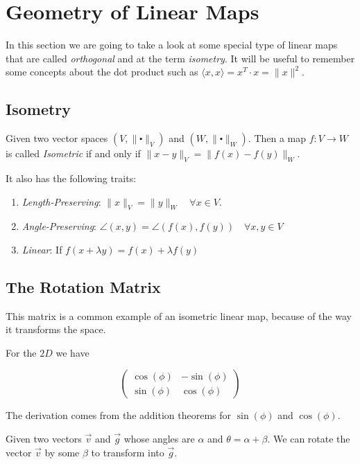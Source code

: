 \newpage
\section{Geometry of Linear Maps}

In this section we are going to take a look at some special type of linear maps that are called \emph{orthogonal} 
and at the term \emph{isometry}. It will be useful to remember some concepts about the dot product such as 
\(\langle x, x \rangle = x^T \cdot x = \|x\|^2\).

\subsection{Isometry}

Given two vector spaces \((V, \|\centerdot\|_V)\) and \((W, \|\centerdot\|_W)\). Then a map 
\(f: V \to W\) is called \emph{Isometric} if and only if \(\|x - y\|_V = \|f(x) - f(y)\|_W \).
\vspace{\baselineskip} 

It also has the following traits:
\begin{enumerate}
	\item \emph{Length-Preserving}: \(\|x\|_V = \|y\|_W \quad \forall x \in V\).
	\item \emph{Angle-Preserving}: \(\angle (x,y) = \angle (f(x),f(y)) \quad \forall x,y \in V\)
	\item \emph{Linear}: If \(f(x + \lambda y) = f(x) + \lambda f(y)\)
\end{enumerate}

\subsection{The Rotation Matrix}

This matrix is a common example of an isometric linear map, because of the way it transforms the space.
\vspace{\baselineskip}

For the \(2D\) we have 

\[
\begin{pmatrix}
    \cos(\phi) & -\sin(\phi)\\
    \sin(\phi) & \cos(\phi)
\end{pmatrix}
\]

The derivation comes from the addition theorems for \(\sin(\phi) \) and \(\cos(\phi)\).
\vspace{\baselineskip}

Given two vectors \(\vec{v}\) and \(\vec{g}\) whose angles are \(\alpha\) and \(\theta = \alpha + \beta\). We 
can rotate the vector \(\vec{v}\) by some \(\beta\) to transform into \(\vec{g}\).

